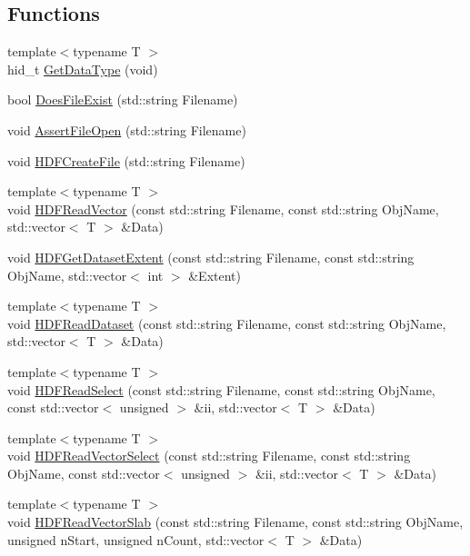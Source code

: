 \subsection*{Functions}
\begin{DoxyCompactItemize}
\item 
{\footnotesize template$<$typename T $>$ }\\hid\_\-t \hyperlink{HDFIO_8h_ae29c5c82995b302af2502eb19bb78490}{GetDataType} (void)
\item 
bool \hyperlink{HDFIO_8h_a5c60b85cf0c953cb2868ba5e01e66771}{DoesFileExist} (std::string Filename)
\item 
void \hyperlink{HDFIO_8h_a11e198795c8dc7e0753daa6b57083645}{AssertFileOpen} (std::string Filename)
\item 
void \hyperlink{HDFIO_8h_aa4eeddaee70eb3ce64662c7d5a0e3687}{HDFCreateFile} (std::string Filename)
\item 
{\footnotesize template$<$typename T $>$ }\\void \hyperlink{HDFIO_8h_a7a9e328246922cdfce8ad23cb4040e9b}{HDFReadVector} (const std::string Filename, const std::string ObjName, std::vector$<$ T $>$ \&Data)
\item 
void \hyperlink{HDFIO_8h_a285070bd55644602c9a8ac1830d44c39}{HDFGetDatasetExtent} (const std::string Filename, const std::string ObjName, std::vector$<$ int $>$ \&Extent)
\item 
{\footnotesize template$<$typename T $>$ }\\void \hyperlink{HDFIO_8h_aa9021278db454aa0b55e9d45db4d1732}{HDFReadDataset} (const std::string Filename, const std::string ObjName, std::vector$<$ T $>$ \&Data)
\item 
{\footnotesize template$<$typename T $>$ }\\void \hyperlink{HDFIO_8h_a7cb9cfc97460cc46d8958d73abf37401}{HDFReadSelect} (const std::string Filename, const std::string ObjName, const std::vector$<$ unsigned $>$ \&ii, std::vector$<$ T $>$ \&Data)
\item 
{\footnotesize template$<$typename T $>$ }\\void \hyperlink{HDFIO_8h_a5ad5843a221c83e26337a48786e1ef4f}{HDFReadVectorSelect} (const std::string Filename, const std::string ObjName, const std::vector$<$ unsigned $>$ \&ii, std::vector$<$ T $>$ \&Data)
\item 
{\footnotesize template$<$typename T $>$ }\\void \hyperlink{HDFIO_8h_a3a874f1791e49402424d5067b1d42182}{HDFReadVectorSlab} (const std::string Filename, const std::string ObjName, unsigned nStart, unsigned nCount, std::vector$<$ T $>$ \&Data)

\end{DoxyCompactItemize}
